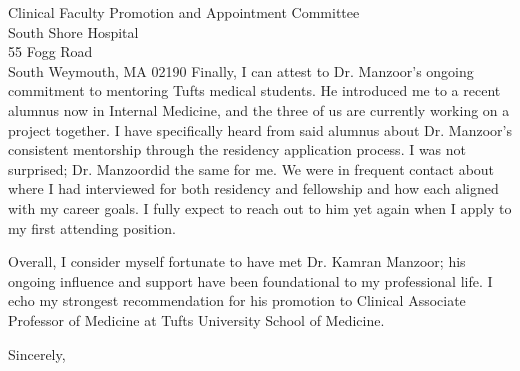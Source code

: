 \documentclass[10pt, a4paper]{letter} %
\newcommand{\candidate}{Dr. Kamran Manzoor}
\newcommand{\candidateShort}{Dr. Manzoor}
\begin{document}
\begin{letter}{
  Clinical Faculty Promotion and Appointment Committee\\
  South Shore Hospital\\
  55 Fogg Road\\
  South Weymouth, MA 02190
}
Finally, I can attest to \candidateShort’s ongoing commitment to mentoring Tufts medical students.
He introduced me to a recent alumnus now in Internal Medicine, and the three of us are currently working on a project together.
I have specifically heard from said alumnus about Dr. Manzoor’s consistent mentorship through the residency application process.
I was not surprised; \candidateShort \space did the same for me. We were in frequent contact about where I had interviewed for both residency and fellowship and how each aligned with my career goals.
I fully expect to reach out to him yet again when I apply to my first attending position. 

Overall, I consider myself fortunate to have met \candidate; his ongoing influence and support have been foundational to my professional life.
I echo my strongest recommendation for his promotion to Clinical Associate Professor of Medicine at Tufts University School of Medicine. 

\closing{Sincerely,}



\end{letter}
\end{document}
